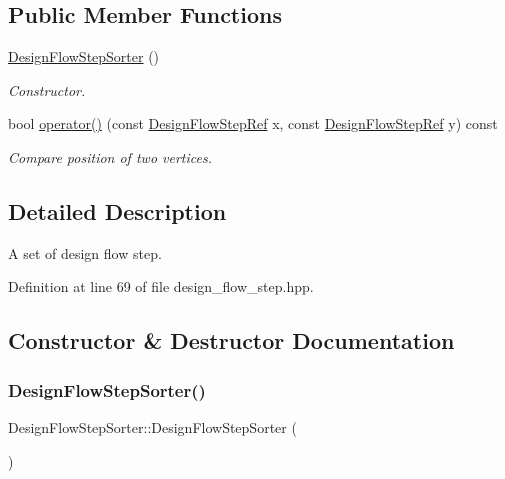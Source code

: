 \subsection*{Public Member Functions}
\begin{DoxyCompactItemize}
\item 
\hyperlink{classDesignFlowStepSorter_aba239e01253a13cab075247c0eeab260}{Design\+Flow\+Step\+Sorter} ()
\begin{DoxyCompactList}\small\item\em Constructor. \end{DoxyCompactList}\item 
bool \hyperlink{classDesignFlowStepSorter_a11d143ee9b2281c1cad9ca12868e979f}{operator()} (const \hyperlink{design__flow__step_8hpp_a9dd6b4474ddf52d41a78b1aaa12ae6c8}{Design\+Flow\+Step\+Ref} x, const \hyperlink{design__flow__step_8hpp_a9dd6b4474ddf52d41a78b1aaa12ae6c8}{Design\+Flow\+Step\+Ref} y) const
\begin{DoxyCompactList}\small\item\em Compare position of two vertices. \end{DoxyCompactList}\end{DoxyCompactItemize}


\subsection{Detailed Description}
A set of design flow step. 

Definition at line 69 of file design\+\_\+flow\+\_\+step.\+hpp.



\subsection{Constructor \& Destructor Documentation}
\mbox{\label{classDesignFlowStepSorter_aba239e01253a13cab075247c0eeab260}} 
\subsubsection{\texorpdfstring{Design\+Flow\+Step\+Sorter()}{DesignFlowStepSorter()}}
{\footnotesize\ttfamily Design\+Flow\+Step\+Sorter\+::\+Design\+Flow\+Step\+Sorter (\begin{DoxyParamCaption}{ }\end{DoxyParamCaption})}



